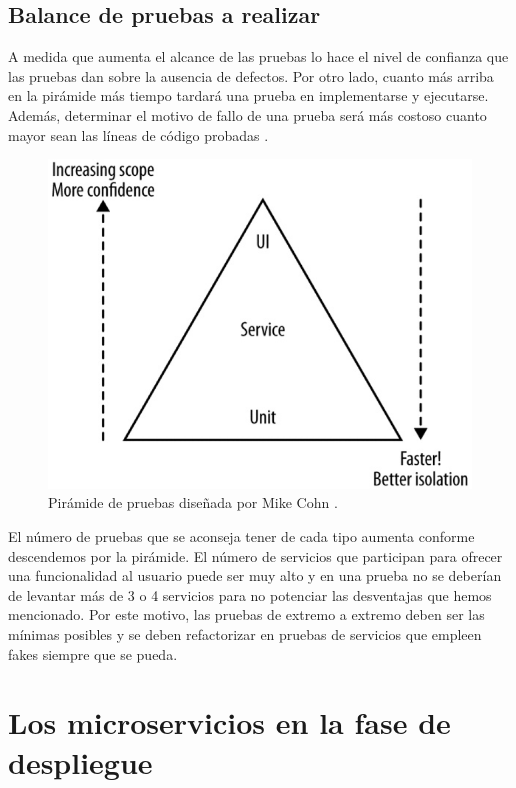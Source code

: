 \documentclass[11pt,spanish,listoffigures]{tfgetsinf}
\begin{document}
\subsection{Balance de pruebas a realizar}

A medida que aumenta el alcance de las pruebas lo hace el nivel de confianza que las pruebas dan sobre la ausencia de defectos. Por otro lado, cuanto más arriba en la pirámide más tiempo tardará una prueba en implementarse y ejecutarse. Además, determinar el motivo de fallo de una prueba será más costoso cuanto mayor sean las líneas de código probadas \cite{Cohn2010}.

\begin{figure}[h]
\centering
\includegraphics[scale=0.5]{Cohn_Pyramid}
\caption{Pirámide de pruebas diseñada por Mike Cohn \cite{Cohn2010}.}
\end{figure}

El número de pruebas que se aconseja tener de cada tipo aumenta conforme descendemos por la pirámide. El número de servicios que participan para ofrecer una funcionalidad al usuario puede ser muy alto y en una prueba no se deberían de levantar más de 3 o 4 servicios para no potenciar las desventajas que hemos mencionado. Por este motivo, las pruebas de extremo a extremo deben ser las mínimas posibles y se deben refactorizar en pruebas de servicios que empleen fakes siempre que se pueda.

\section{Los microservicios en la fase de despliegue}
\end{document}
